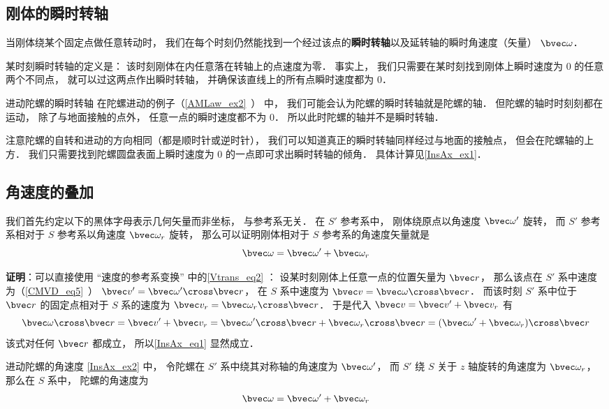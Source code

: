 


\subsection{刚体的瞬时转轴}
当刚体绕某个固定点做任意转动时， 我们在每个时刻仍然能找到一个经过该点的\textbf{瞬时转轴}以及延转轴的瞬时角速度（矢量） $\bvec \omega$．

某时刻瞬时转轴的定义是： 该时刻刚体在内任意落在转轴上的点速度为零． 事实上， 我们只需要在某时刻找到刚体上瞬时速度为 0 的任意两个不同点， 就可以过这两点作出瞬时转轴， 并确保该直线上的所有点瞬时速度都为 0．

\begin{example}{进动陀螺的瞬时转轴}\label{InsAx_ex2}
在陀螺进动的例子（\autoref{AMLaw_ex2}~） 中， 我们可能会认为陀螺的瞬时转轴就是陀螺的轴． 但陀螺的轴时时刻刻都在运动， 除了与地面接触的点外， 任意一点的瞬时速度都不为 0． 所以此时陀螺的轴并不是瞬时转轴．

注意陀螺的自转和进动的方向相同（都是顺时针或逆时针）， 我们可以知道真正的瞬时转轴同样经过与地面的接触点， 但会在陀螺轴的上方． 我们只需要找到陀螺圆盘表面上瞬时速度为 0 的一点即可求出瞬时转轴的倾角． 具体计算见\autoref{InsAx_ex1}．
\end{example}

\subsection{角速度的叠加}

我们首先约定以下的黑体字母表示几何矢量而非坐标， 与参考系无关． 在 $S'$ 参考系中， 刚体绕原点以角速度 $\bvec \omega'$ 旋转， 而 $S'$ 参考系相对于 $S$ 参考系以角速度 $\bvec \omega_r$ 旋转， 那么可以证明刚体相对于 $S$ 参考系的角速度矢量就是
\begin{equation}\label{InsAx_eq1}
\bvec \omega = \bvec \omega' + \bvec \omega_r
\end{equation}

\textbf{证明}：可以直接使用 “速度的参考系变换” 中的\autoref{Vtrans_eq2} ： 设某时刻刚体上任意一点的位置矢量为 $\bvec r$， 那么该点在 $S'$ 系中速度为（\autoref{CMVD_eq5}~） $\bvec v' = \bvec\omega'\cross\bvec r$， 在 $S$ 系中速度为 $\bvec v = \bvec\omega\cross\bvec r$． 而该时刻 $S'$ 系中位于 $\bvec r$ 的固定点相对于 $S$ 系的速度为 $\bvec v_r = \bvec\omega_r\cross\bvec r$． 于是代入 $\bvec v = \bvec v' + \bvec v_r$ 有
\begin{equation}
\bvec\omega\cross\bvec r = \bvec v' + \bvec v_r = \bvec\omega'\cross\bvec r + \bvec\omega_r\cross\bvec r
= (\bvec\omega' + \bvec\omega_r)\cross\bvec r
\end{equation}
该式对任何 $\bvec r$ 都成立， 所以\autoref{InsAx_eq1} 显然成立．

\begin{example}{进动陀螺的角速度}\label{InsAx_ex1}
\autoref{InsAx_ex2} 中， 令陀螺在 $S'$ 系中绕其对称轴的角速度为 $\bvec \omega'$， 而 $S'$ 绕 $S$ 关于 $z$ 轴旋转的角速度为 $\bvec \omega_r$， 那么在 $S$ 系中， 陀螺的角速度为
\begin{equation}
\bvec \omega = \bvec \omega' + \bvec \omega_r
\end{equation}
\end{example}
